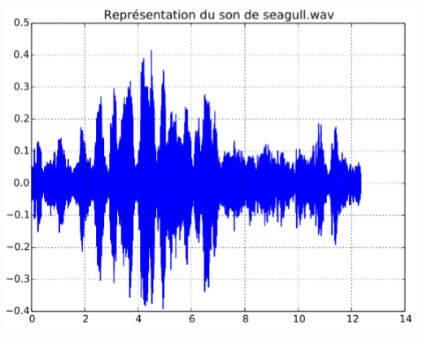 \documentclass[10pt,fleqn]{article} %
\begin{document}
\begin{multicols}{2}
\vspace*{1cm}

\centerline{\includegraphics[width=\linewidth]{images/theme_son_2_fig_3}}

 \fi
%
%
%
%
%
%
%
%
%

\ifprof
\else
\end{multicols}
\fi
\end{document}
